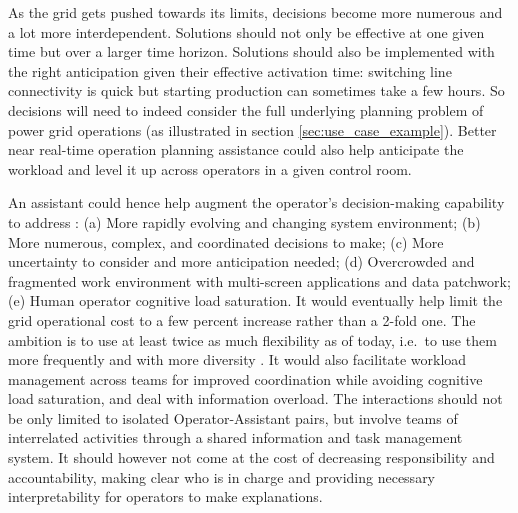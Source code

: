 \documentclass{IOS-Book-Article}
\begin{document}
As the grid gets pushed towards its limits, decisions become more numerous and a lot more interdependent. Solutions should not only be effective at one given time but over a larger time horizon. Solutions should also be implemented with the right anticipation given their effective activation time: switching line connectivity is quick but starting production can sometimes take a few hours. So decisions will need to indeed consider the full underlying planning problem of power grid operations (as illustrated in section \ref{sec:use_case_example}). Better near real-time operation planning assistance could also help anticipate the workload and level it up across operators in a given control room.

An assistant could hence help augment the operator's decision-making capability  to address \cite{marot2022perspectives}: (a) More rapidly evolving and changing system environment; (b) More numerous, complex, and coordinated decisions to make; (c) More uncertainty to consider and more anticipation needed; (d) Overcrowded and fragmented work environment with multi-screen applications and data patchwork; (e) Human operator cognitive load saturation. It would eventually help limit the grid operational cost to a few percent increase rather than a 2-fold one. The ambition is to use at least twice as much flexibility as of today, i.e.\ to use them more frequently and with more diversity \cite{energy2021pathways}. It would also facilitate workload \cite{ghalenoei2022impact} management across teams for improved coordination \cite{harbers2017value} while avoiding cognitive load saturation, and deal with information overload. The interactions should not be only limited to isolated Operator-Assistant pairs, but involve teams of interrelated activities through a shared information and task management system. It should however not come at the cost of decreasing responsibility and accountability, making clear who is in charge and providing necessary interpretability for operators to make explanations.

\end{document}
